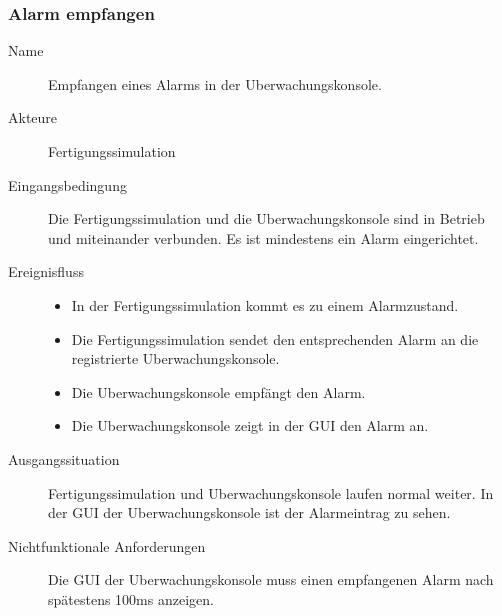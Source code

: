 \documentclass[parskip=full]{scrartcl}
\begin{document}
\subsubsection{Alarm empfangen}
\begin{description}
 \item[Name] Empfangen eines Alarms in der \gls{Uberwachungskonsole}.
 \item[Akteure] \gls{Fertigungssimulation}
 \item[Eingangsbedingung] Die \gls{Fertigungssimulation} und die \gls{Uberwachungskonsole} sind in Betrieb und miteinander verbunden.
  Es ist mindestens ein Alarm eingerichtet.
 \item[Ereignisfluss]
 \begin{itemize}[noitemsep]
  \item In der \gls{Fertigungssimulation} kommt es zu einem Alarmzustand.
  \item Die \gls{Fertigungssimulation} sendet den entsprechenden Alarm an die registrierte \gls{Uberwachungskonsole}.
  \item Die \gls{Uberwachungskonsole} empf\"angt den Alarm.
  \item Die \gls{Uberwachungskonsole} zeigt in der \gls{GUI} den Alarm an.
 \end{itemize}
 \item[Ausgangssituation] \gls{Fertigungssimulation} und \gls{Uberwachungskonsole} laufen normal weiter. In der \gls{GUI} der
  \gls{Uberwachungskonsole} ist der Alarmeintrag zu sehen.
 \item [Nichtfunktionale Anforderungen] Die \gls{GUI} der \gls{Uberwachungskonsole} muss einen empfangenen Alarm nach sp\"atestens
  100ms anzeigen.
\end{description}
\end{document}
